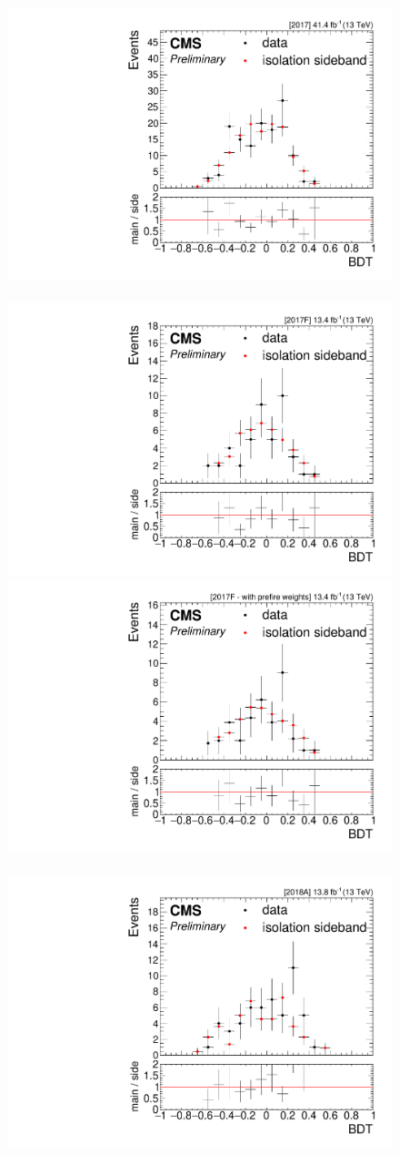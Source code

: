 \begin{figure}[!htb]
\centering
\includegraphics[width=0.48\linewidth]{plots/dilepton_muons_data_isocr_no_retag_CorrJetNoMultIso10_06_invmass_same_sign_2017/none_dilepBDTCorrJetNoMultIso10Dr0.6.pdf} \,
\includegraphics[width=0.48\linewidth]{plots/dilepton_muons_data_isocr_no_retag_CorrJetNoMultIso10_06_invmass_same_sign_2017F/none_dilepBDTCorrJetNoMultIso10Dr0.6.pdf} \\
\includegraphics[width=0.48\linewidth]{plots/dilepton_muons_data_isocr_no_retag_CorrJetNoMultIso10_06_invmass_same_sign_2017F_prefire/none_dilepBDTCorrJetNoMultIso10Dr0.6.pdf}  \,
\includegraphics[width=0.48\linewidth]{plots/dilepton_muons_data_isocr_no_retag_CorrJetNoMultIso10_06_invmass_same_sign_2018A/none_dilepBDTCorrJetNoMultIso10Dr0.6.pdf} \\

\end{figure}
